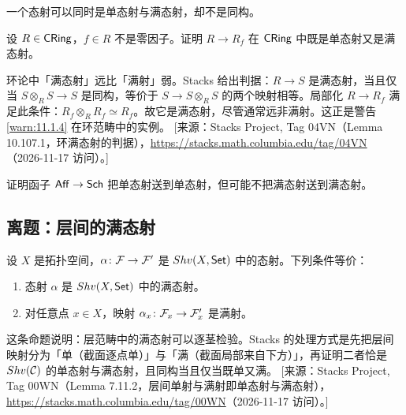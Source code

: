 \begin{warning}\label{warn:11.1.4}
一个态射可以同时是单态射与满态射，却不是同构。
\end{warning}

\begin{exercise}\label{exc:11.1.5}
设 $R \in \mathsf{CRing}$，$f \in R$ 不是零因子。证明 $R \to R_f$ 在 $\mathsf{CRing}$ 中既是单态射又是满态射。
\end{exercise}

\begin{yizhu}
环论中「满态射」远比「满射」弱。Stacks 给出判据：$R \to S$ 是满态射，当且仅当 $S \otimes_R S \to S$ 是同构，等价于 $S \to S \otimes_R S$ 的两个映射相等。局部化 $R \to R_f$ 满足此条件：$R_f \otimes_R R_f \simeq R_f$。故它是满态射，尽管通常远非满射。这正是警告 \ref{warn:11.1.4} 在环范畴中的实例。
[来源：Stacks Project, Tag 04VN（Lemma 10.107.1，环满态射的判据），\url{https://stacks.math.columbia.edu/tag/04VN}（2026-11-17 访问）。]
\end{yizhu}

\begin{exercise}\label{exc:11.1.6}
证明函子 $\mathsf{Aff} \to \mathsf{Sch}$ 把单态射送到单态射，但可能不把满态射送到满态射。
\end{exercise}

\subsection{离题：层间的满态射}\label{sec:11.2}

\begin{proposition}\label{prop:11.2.1}
设 $X$ 是拓扑空间，$\alpha \colon \mathcal{F} \to \mathcal{F}'$ 是 $Shv(X,\mathsf{Set})$ 中的态射。下列条件等价：
\begin{enumerate}[label=(\roman*),leftmargin=2em,itemsep=0.25ex]
  \item 态射 $\alpha$ 是 $Shv(X,\mathsf{Set})$ 中的满态射。
  \item 对任意点 $x \in X$，映射 $\alpha_x \colon \mathcal{F}_x \to \mathcal{F}'_x$ 是满射。
\end{enumerate}
\end{proposition}

\begin{yizhu}
这条命题说明：层范畴中的满态射可以逐茎检验。Stacks 的处理方式是先把层间映射分为「单（截面逐点单）」与「满（截面局部来自下方）」，再证明二者恰是 $Shv(\mathcal{C})$ 的单态射与满态射，且同构当且仅当既单又满。
[来源：Stacks Project, Tag 00WN（Lemma 7.11.2，层间单射与满射即单态射与满态射），\url{https://stacks.math.columbia.edu/tag/00WN}（2026-11-17 访问）。]
\end{yizhu}

